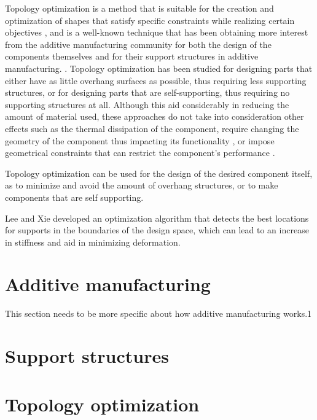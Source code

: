 \documentclass[../main.tex]{subfiles}
\begin{document}
Topology optimization is a method that is suitable for the creation and optimization of shapes that satisfy specific constraints while realizing certain objectives \cite{bendsoeTopologyOptimization2002},  and is a well-known technique that has been obtaining more interest from the additive manufacturing community for both the design of the components themselves and for their support structures in additive manufacturing. . Topology optimization has been studied for designing parts that either have as little overhang surfaces as possible, thus requiring less supporting structures, or for designing parts that are self-supporting, thus requiring no supporting structures at all. Although this aid considerably in reducing the amount of material used, these approaches do not take into consideration other effects such as the thermal dissipation of the component, require changing the geometry of the component thus impacting its functionality \cite{yeTopologyOptimisationSelfsupporting2023}, or impose geometrical constraints that can restrict the component's performance \cite{langelaarTOPOLOGYOPTIMIZATIONADDITIVE2016}.

Topology optimization can be used for the design of the desired component itself, as to minimize and avoid the amount of overhang structures, or to make components that are self supporting.


Lee and Xie \cite{leeSimultaneouslyOptimizingSupports2021} developed an optimization algorithm that detects the best locations for supports in the boundaries of the design space, which can lead to an increase in stiffness and aid in minimizing deformation.

\section{Additive manufacturing}

This section needs to be more specific about how additive manufacturing works.1

\section{Support structures}

\section{Topology optimization}
\end{document}
